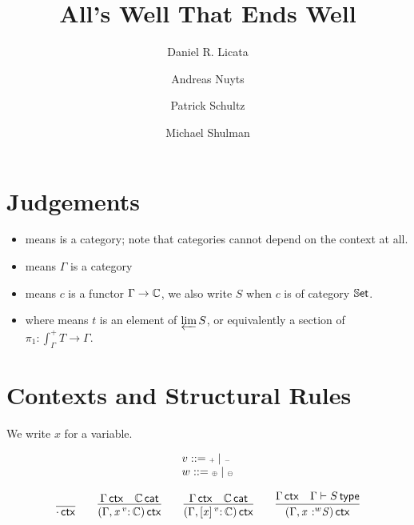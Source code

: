 \documentclass[11pt]{article}
\title{All's Well That Ends Well}
\author{Daniel R. Licata \and Andreas Nuyts \and Patrick Schultz \and Michael Shulman}
\theoremstyle{plain}
\begin{document}
\maketitle

\section{Judgements}

\begin{itemize}

\item \wfdtp{\C} means \C\/ is a category; note that categories cannot
  depend on the context at all.  

\item \wfctx{\G} means $\Gamma$ is a category

\item {} means $c$ is a functor
  ${\Gamma} \to \mathbb{C}$, we also write $S$ when $c$ is of category $\mathbb{S}\mathsf{et}$.  

\item {} where
   means $t$ is an element of $\varprojlim S$, or equivalently a section of $\pi_1 : \int_\Gamma^+ T \to \Gamma$.

\end{itemize}

\section{Contexts and Structural Rules}

We write $x$ for a variable. 

\[
\begin{array}{l}
v ::= {\text{\tiny $\mathord{+}$}} \mid {\text{\tiny $\mathord{-}$}} \\
w ::= {\text{\tiny $\mathord{\oplus}$}} \mid {\text{\tiny $\mathord{\ominus}$}} \\
\end{array}
\]

\[
\begin{array}{c}
\infer{\wfctx{\cdot}}{}
\qquad
\infer{\wfctx{(\Gamma,\catvar{x}{v}{\C})}}
      {\wfctx{\Gamma} & 
       \wfdtp{\C}
      } 
\qquad
\infer{\wfctx{(\Gamma,\twcatvar{x}{v}{\C})}}
      {\wfctx{\Gamma} & 
       \wfdtp{\C}
      } 
\qquad
\infer{\wfctx{(\Gamma,\tpvar{x}{w}{S})}}
      {\wfctx{\Gamma} & 
        \wftp{\Gamma}{S}
      } 
\end{array}
\]
\end{document}
